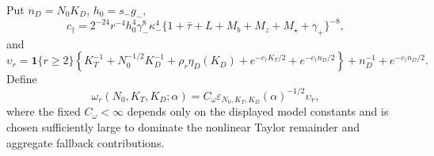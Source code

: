 Put \(n_D=N_0K_D\), \(h_0=s_-g_-\),
\[
 c_\dagger=2^{-24}r^{-4}h_0^4\gamma_-^8\kappa_-^4
 \{1+\bar\tau+L+M_b+M_z+M_\star+\gamma_+\}^{-8},
\]
and
\[
 \upsilon_r=
 \mathbf 1\{r\ge2\}\left\{K_T^{-1}+N_0^{-1/2}K_D^{-1}
 +\rho_r\eta_D(K_D)+e^{-c_\dagger K_T/2}+e^{-c_\dagger n_D/2}\right\}
 +n_D^{-1}+e^{-c_\dagger n_D/2}.
\]
Define
\[
 \omega_r(N_0,K_T,K_D;\alpha)
 =C_\omega\varepsilon_{N_0,K_T,K_D}(\alpha)^{-1/2}\upsilon_r,
\]
where the fixed \(C_\omega<\infty\) depends only on the displayed model constants and is chosen sufficiently large to dominate the nonlinear Taylor remainder and aggregate fallback contributions.